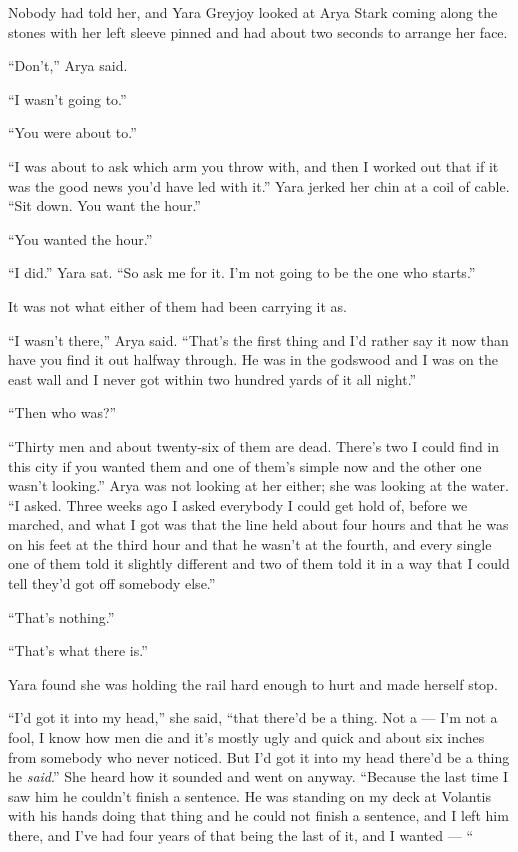 Nobody had told her, and Yara Greyjoy looked at Arya Stark coming along the stones with her left sleeve pinned and had about two seconds to arrange her face.

“Don’t,” Arya said.

“I wasn’t going to.”

“You were about to.”

“I was about to ask which arm you throw with, and then I worked out that if it was the good news you’d have led with it.” Yara jerked her chin at a coil of cable. “Sit down. You want the hour.”

“You wanted the hour.”

“I did.” Yara sat. “So ask me for it. I’m not going to be the one who starts.”

\sceneBreak

It was not what either of them had been carrying it as.

“I wasn’t there,” Arya said. “That’s the first thing and I’d rather say it now than have you find it out halfway through. He was in the godswood and I was on the east wall and I never got within two hundred yards of it all night.”

“Then who was?”

“Thirty men and about twenty-six of them are dead. There’s two I could find in this city if you wanted them and one of them’s simple now and the other one wasn’t looking.” Arya was not looking at her either; she was looking at the water. “I asked. Three weeks ago I asked everybody I could get hold of, before we marched, and what I got was that the line held about four hours and that he was on his feet at the third hour and that he wasn’t at the fourth, and every single one of them told it slightly different and two of them told it in a way that I could tell they’d got off somebody else.”

“That’s nothing.”

“That’s what there is.”

Yara found she was holding the rail hard enough to hurt and made herself stop.

“I’d got it into my head,” she said, “that there’d be a thing. Not a — I’m not a fool, I know how men die and it’s mostly ugly and quick and about six inches from somebody who never noticed. But I’d got it into my head there’d be a thing he \textit{said}.” She heard how it sounded and went on anyway. “Because the last time I saw him he couldn’t finish a sentence. He was standing on my deck at Volantis with his hands doing that thing and he could not finish a sentence, and I left him there, and I’ve had four years of that being the last of it, and I wanted — “

